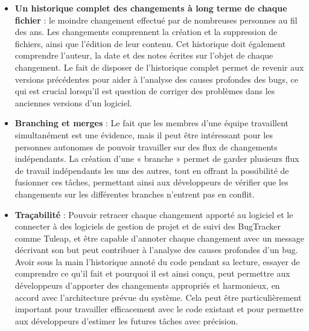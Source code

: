 \begin{itemize}
   \item \textbf{Un historique complet des changements à long terme de chaque fichier} : le moindre changement effectué par de nombreuses personnes au fil des ans. Les changements comprennent la création et la suppression de fichiers, ainsi que l'édition de leur contenu. Cet historique doit également comprendre l'auteur, la date et des notes écrites sur l'objet de chaque changement. Le fait de disposer de l'historique complet permet de revenir aux versions précédentes pour aider à l'analyse des causes profondes des bugs, ce qui est crucial lorsqu'il est question de corriger des problèmes dans les anciennes versions d'un logiciel.
   \item \textbf{Branching et merges} : Le fait que les membres d'une équipe travaillent simultanément est une évidence, mais il peut être intéressant pour les personnes autonomes de pouvoir travailler sur des flux de changements indépendants. La création d'une « branche »  permet de garder plusieurs flux de travail indépendants les uns des autres, tout en offrant la possibilité de fusionner ces tâches, permettant ainsi aux développeurs de vérifier que les changements sur les différentes branches n'entrent pas en conflit.
   \item \textbf{Traçabilité} : Pouvoir retracer chaque changement apporté au logiciel et le connecter à des logiciels de gestion de projet et de suivi des BugTracker comme Tuleap, et être capable d'annoter chaque changement avec un message décrivant son but peut contribuer à l'analyse des causes profondes d'un bug. Avoir sous la main l'historique annoté du code pendant sa lecture, essayer de comprendre ce qu'il fait et pourquoi il est ainsi conçu, peut permettre aux développeurs d'apporter des changements appropriés et harmonieux, en accord avec l'architecture prévue du système. Cela peut être particulièrement important pour travailler efficacement avec le code existant et pour permettre aux développeurs d'estimer les futures tâches avec précision.
\end{itemize}
